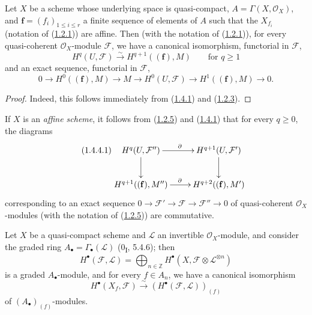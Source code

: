 \begin{corollary}[1.4.3]
\label{III.1.4.3}
Let $X$ be a scheme whose underlying space is quasi-compact,
$A=\Gamma(X,\mathcal O_X)$, and $\mathbf f=(f_i)_{1\leq i\leq r}$ a finite
sequence of elements of $A$ such that the $X_{f_i}$ (notation of
(\hyperref[III.1.2.1]{1.2.1})) are affine. Then (with the notation
of (\hyperref[III.1.2.1]{1.2.1})), for every quasi-coherent
$\mathcal O_X$-module $\mathcal F$, we have a canonical isomorphism,
functorial in $\mathcal F$,
\begin{equation}
\label{III.1.4.3.1}
\tag{1.4.3.1}
H^q(U,\mathcal F)\xrightarrow{\sim}H^{q+1}((\mathbf f),M)
\qquad\text{for }q\geq1
\end{equation}
and an exact sequence, functorial in $\mathcal F$,
\begin{equation}
\label{III.1.4.3.2}
\tag{1.4.3.2}
0\longrightarrow H^0((\mathbf f),M)\longrightarrow M
\longrightarrow H^0(U,\mathcal F)
\longrightarrow H^1((\mathbf f),M)\longrightarrow0.
\end{equation}
\end{corollary}

\begin{proof}
Indeed, this follows immediately from
(\hyperref[III.1.4.1]{1.4.1}) and
(\hyperref[III.1.2.3]{1.2.3}).
\end{proof}

\begin{env}[1.4.4]
\label{III.1.4.4}
If $X$ is an \emph{affine scheme}, it follows from
(\hyperref[III.1.2.5]{1.2.5}) and
(\hyperref[III.1.4.1]{1.4.1}) that for every $q\geq0$, the diagrams
\begin{equation}
\label{III.1.4.4.1}
\tag{1.4.4.1}
\xymatrix{
H^q(U,\mathcal F'')\ar[r]^{\partial}\ar[d]
&H^{q+1}(U,\mathcal F')\ar[d]\\
H^{q+1}((\mathbf f),M'')\ar[r]^{\partial}
&H^{q+2}((\mathbf f),M')
}
\end{equation}
corresponding to an exact sequence
$0\to\mathcal F'\to\mathcal F\to\mathcal F''\to0$ of quasi-coherent
$\mathcal O_X$-modules (with the notation of
(\hyperref[III.1.2.5]{1.2.5})) are commutative.
\end{env}

\begin{proposition}[1.4.5]
\label{III.1.4.5}
Let $X$ be a quasi-compact scheme and $\mathcal L$ an invertible
$\mathcal O_X$-module, and consider the graded ring
$A_\bullet=\Gamma_\bullet(\mathcal L)$ (0\textsubscript{I}, 5.4.6); then
\[
H^\bullet(\mathcal F,\mathcal L)
=\bigoplus_{n\in\mathbb Z}H^\bullet(X,\mathcal F\otimes\mathcal L^{\otimes n})
\]
is a graded $A_\bullet$-module, and for every $f\in A_n$, we have a
canonical isomorphism
\begin{equation}
\label{III.1.4.5.1}
\tag{1.4.5.1}
H^\bullet(X_f,\mathcal F)
\xrightarrow{\sim}(H^\bullet(\mathcal F,\mathcal L))_{(f)}
\end{equation}
of $(A_\bullet)_{(f)}$-modules.
\end{proposition}

